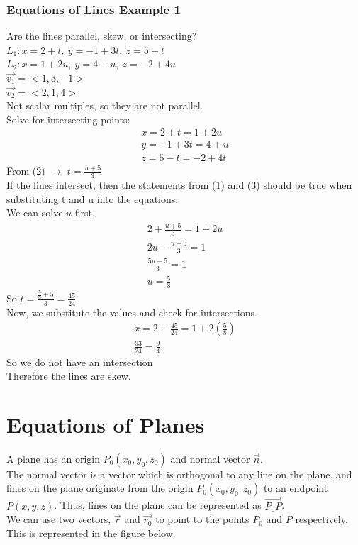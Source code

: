 \documentclass[12pt]{article}
\begin{document}
\subsubsection{Equations of Lines Example 1}
Are the lines parallel, skew, or intersecting?\\%
$L_1: x = 2 + t,\ y = -1 + 3t,\ z = 5-t$\\%
$L_2: x = 1 + 2u,\ y = 4 + u,\ z = -2 + 4u$\\%
$\vec{v_1}=<1, 3, -1>  $\\%
$\vec{v_2} =<2,1,4> $\\%
Not scalar multiples, so they are not parallel.\\%
Solve for intersecting points:
\begin{align}
	x=2+t=1+2u\\%
	y=-1+3t=4+u\\%
	z=5-t=-2+4t
\end{align}
From (2) $\rightarrow$  \(t=\frac{u+5}{3}\)\\%
If the lines intersect, then the statements from (1) and (3) should be true when substituting t and u into the equations.
\\We can solve \(u\) first.
\begin{align}
	2+\frac{u+5}{3}=1+2u\\%
	2u-\frac{u+5}{3}=1\\%
	\frac{5u-5}{3}=1\\%
	u = \frac{5}{8}
\end{align}
So \(t=\frac{\frac{5}{8}+5}{3}= \frac{45}{24}\)\\%
Now, we substitute the values and check for intersections.
\begin{align}
	x=2+\frac{45}{24}=1+2 (\frac{5}{8})\\%
	\frac{93}{24}=\frac{9}{4}
\end{align}
So we do not have an intersection\\%
Therefore the lines are skew.

\section{Equations of Planes}

A plane has an origin \(P_0(x_0,y_0,z_0)\) and normal vector \(\vec{n} \).\\%
The normal vector is a vector which is orthogonal to any line on the plane, and lines on the plane originate from the origin \(P_0(x_0,y_0,z_0)\) to an endpoint \(P(x,y,z)\). Thus, lines on the plane can be represented as \(\vec{P_0P} \). \\%
We can use two vectors, \(\vec{r}\) and  \( \vec{r_0} \) to point to the points \(P_0\) and \(P\) respectively. This is represented in the figure below.
\end{document}
